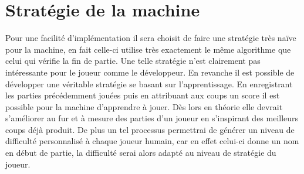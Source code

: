 \section{Stratégie de la machine}

Pour une facilité d'implémentation il sera choisit de faire une stratégie très naïve pour la machine, en fait celle-ci utilise très exactement le même algorithme que celui qui vérifie la fin de partie.
Une telle stratégie n'est clairement pas intéressante pour le joueur comme le développeur. En revanche il est possible de développer une véritable stratégie se basant sur l'apprentissage. En enregistrant les parties précédemment jouées puis en attribuant aux coups un score il est possible pour la machine d'apprendre à jouer. Dès lors en théorie elle devrait s'améliorer au fur et à mesure des parties d'un joueur en s'inspirant des meilleurs coups déjà produit. De plus un tel processus permettrai de générer un niveau de difficulté personnalisé à chaque joueur humain, car en effet celui-ci donne un nom en début de partie, la difficulté serai alors adapté au niveau de stratégie du joueur.